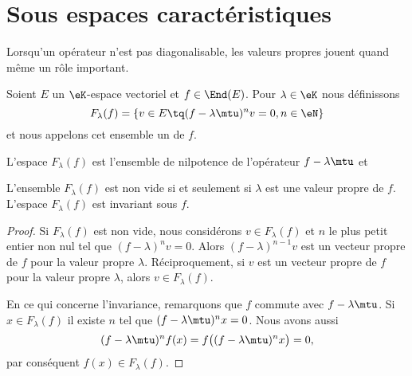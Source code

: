 \section{Sous espaces caractéristiques}


Lorsqu'un opérateur n'est pas diagonalisable, les valeurs propres jouent quand même un rôle important.

\begin{definition}  \label{DefFBNIooCGbIix}
    Soient \( E\) un \( \eK\)-espace vectoriel et \( f\in\End(E)\). Pour \( \lambda\in \eK\) nous définissons
    \begin{equation}
        F_{\lambda}(f)=\{ v\in E\tq (f-\lambda\mtu)^nv=0, n\in\eN \}
    \end{equation}
    et nous appelons cet ensemble un  de \( f\).
\end{definition}
L'espace \( F_{\lambda}(f)\) est l'ensemble de nilpotence de l'opérateur \( f-\lambda\mtu\) et

\begin{lemma}   \label{LemBLPooHMAoyJ}
    L'ensemble \( F_{\lambda}(f)\) est non vide si et seulement si \( \lambda\) est une valeur propre de \( f\). L'espace \( F_{\lambda}(f)\) est invariant sous \( f\).
\end{lemma}

\begin{proof}
    Si \( F_{\lambda}(f)\) est non vide, nous considérons \( v\in F_{\lambda}(f)\) et \( n\) le plus petit entier non nul tel que \( (f-\lambda)^nv=0\). Alors \( (f-\lambda)^{n-1}v\) est un vecteur propre de \( f\) pour la valeur propre \( \lambda\). Réciproquement, si \( v\) est un vecteur propre de \( f\) pour la valeur propre \( \lambda\), alors \( v\in F_{\lambda}(f)\).

    En ce qui concerne l'invariance, remarquons que \( f\) commute avec \( f-\lambda\mtu\). Si \( x\in F_{\lambda}(f)\) il existe \( n\) tel que \( (f-\lambda\mtu)^nx=0\). Nous avons aussi
    \begin{equation}
        (f-\lambda\mtu)^nf(x)=f\big( (f-\lambda\mtu)^nx \big)=0,
    \end{equation}
    par conséquent \( f(x)\in F_{\lambda}(f)\).
\end{proof}

